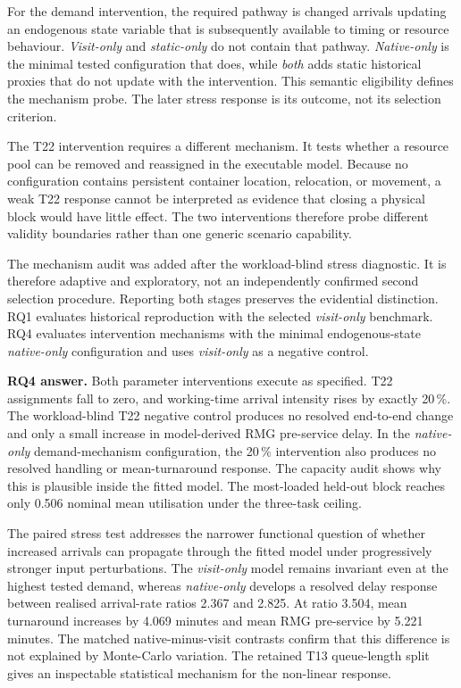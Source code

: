 For the demand intervention, the required pathway is changed arrivals updating
an endogenous state variable that is subsequently available to timing or
resource behaviour. \textit{Visit-only} and \textit{static-only} do not contain
that pathway. \textit{Native-only} is the minimal tested configuration that
does, while \textit{both} adds static historical proxies that do not update
with the intervention. This semantic eligibility defines the mechanism probe.
The later stress response is its outcome, not its selection criterion.

The T22 intervention requires a different mechanism. It tests whether a
resource pool can be removed and reassigned in the executable model. Because
no configuration contains persistent container location, relocation, or
movement, a weak T22 response cannot be interpreted as evidence that closing a
physical block would have little effect. The two interventions therefore probe
different validity boundaries rather than one generic scenario capability.

The mechanism audit was added after the workload-blind stress diagnostic. It is
therefore adaptive and exploratory, not an independently confirmed second
selection procedure. Reporting both stages preserves the evidential
distinction. RQ1 evaluates historical reproduction with the selected
\textit{visit-only} benchmark. RQ4 evaluates intervention mechanisms with the
minimal endogenous-state \textit{native-only} configuration and uses
\textit{visit-only} as a negative control.

\medskip

\noindent\textbf{RQ4 answer.} Both parameter interventions execute as specified.
T22 assignments fall to zero, and working-time arrival intensity rises by
exactly 20\,\%. The workload-blind T22 negative control produces no resolved
end-to-end change and only a small increase in model-derived RMG pre-service
delay. In the \textit{native-only} demand-mechanism configuration, the 20\,\% intervention also
produces no resolved handling or mean-turnaround response. The capacity audit
shows why this is plausible inside the fitted model. The most-loaded held-out
block reaches only 0.506 nominal mean utilisation under the three-task
ceiling.

The paired stress test addresses the narrower functional question of whether
increased arrivals can propagate through the fitted model under progressively
stronger input perturbations. The
\textit{visit-only} model remains invariant even at the highest tested demand,
whereas \textit{native-only} develops a resolved delay response between
realised arrival-rate ratios 2.367 and 2.825. At ratio 3.504, mean turnaround
increases by 4.069 minutes and mean RMG pre-service by 5.221 minutes. The
matched native-minus-visit contrasts confirm that this difference is not
explained by Monte-Carlo variation. The retained T13 queue-length split gives
an inspectable statistical mechanism for the non-linear response.

